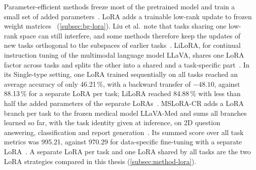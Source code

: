 Parameter-efficient methods freeze most of the pretrained model and train a small set of added parameters~\cite[Sec.~4.3]{liu2026continuallearningvlmssurvey}.
LoRA adds a trainable low-rank update to frozen weight matrices~\cite{hu2022lora} (\cref{subsec:bg-lora}).
Liu et al.\ note that tasks sharing one low-rank space can still interfere, and some methods therefore keep the updates of new tasks orthogonal to the subspaces of earlier tasks~\cite[Sec.~4.3]{liu2026continuallearningvlmssurvey}.
LiLoRA, for continual instruction tuning of the multimodal language model LLaVA, shares one LoRA factor across tasks and splits the other into a shared and a task-specific part~\cite{che2026loraloraparameterefficientarchitecture}.
In its Single-type setting, one LoRA trained sequentially on all tasks reached an average accuracy of only 46.21\,\%, with a backward transfer of $-48.10$, against 88.13\,\% for a separate LoRA per task; LiLoRA reached 84.88\,\% with less than half the added parameters of the separate LoRAs~\cite{che2026loraloraparameterefficientarchitecture}.
MSLoRA-CR adds a LoRA branch per task to the frozen medical model LLaVA-Med and sums all branches learned so far, with the task identity given at inference, on 2D question answering, classification and report generation~\cite{Zhang_2025}.
Its summed score over all task metrics was 995.21, against 970.29 for data-specific fine-tuning with a separate LoRA~\cite{Zhang_2025}.
A separate LoRA per task and one LoRA shared by all tasks are the two LoRA strategies compared in this thesis (\cref{subsec:method-lora}).


